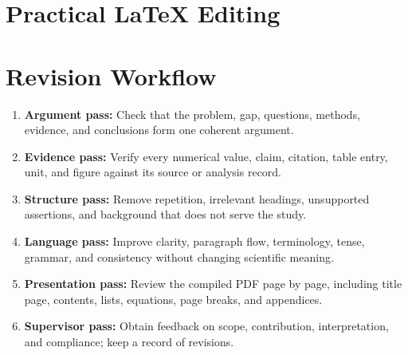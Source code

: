 \documentclass[12pt,a4paper,oneside]{report}
\begin{document}
\section{Practical LaTeX Editing}

\section{Revision Workflow}
\begin{enumerate}
\item \textbf{Argument pass:} Check that the problem, gap, questions,
methods, evidence, and conclusions form one coherent argument.
\item \textbf{Evidence pass:} Verify every numerical value, claim, citation,
table entry, unit, and figure against its source or analysis record.
\item \textbf{Structure pass:} Remove repetition, irrelevant headings,
unsupported assertions, and background that does not serve the study.
\item \textbf{Language pass:} Improve clarity, paragraph flow, terminology,
tense, grammar, and consistency without changing scientific meaning.
\item \textbf{Presentation pass:} Review the compiled PDF page by page,
including title page, contents, lists, equations, page breaks, and appendices.
\item \textbf{Supervisor pass:} Obtain feedback on scope, contribution,
interpretation, and compliance; keep a record of revisions.
\end{enumerate}
\end{document}
